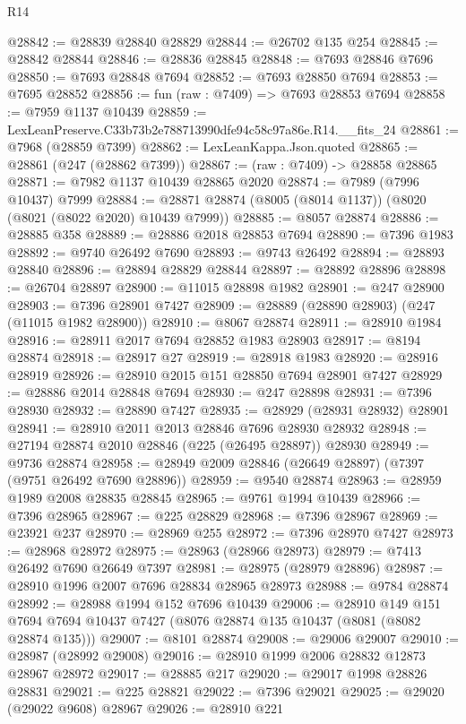 \begin{lexlean}{R14}
\begin{coremodule}
@28842 := @28839 @28840 @28829
@28844 := @26702 @135 @254
@28845 := @28842 @28844
@28846 := @28836 @28845
@28848 := @7693 @28846 @7696
@28850 := @7693 @28848 @7694
@28852 := @7693 @28850 @7694
@28853 := @7695 @28852
@28856 := fun (raw : @7409) => @7693 @28853 @7694
@28858 := @7959 @1137 @10439
@28859 := LexLeanPreserve.C33b73b2e788713990dfe94c58c97a86e.R14.__fits_24
@28861 := @7968 (@28859 @7399)
@28862 := LexLeanKappa.Json.quoted
@28865 := @28861 (@247 (@28862 @7399))
@28867 := (raw : @7409) -> @28858 @28865
@28871 := @7982 @1137 @10439 @28865 @2020
@28874 := @7989 (@7996 @10437) @7999
@28884 := @28871 @28874 (@8005 (@8014 @1137)) (@8020 (@8021 (@8022 @2020) @10439 @7999))
@28885 := @8057 @28874
@28886 := @28885 @358
@28889 := @28886 @2018 @28853 @7694
@28890 := @7396 @1983
@28892 := @9740 @26492 @7690
@28893 := @9743 @26492
@28894 := @28893 @28840
@28896 := @28894 @28829 @28844
@28897 := @28892 @28896
@28898 := @26704 @28897
@28900 := @11015 @28898 @1982
@28901 := @247 @28900
@28903 := @7396 @28901 @7427
@28909 := @28889 (@28890 @28903) (@247 (@11015 @1982 @28900))
@28910 := @8067 @28874
@28911 := @28910 @1984
@28916 := @28911 @2017 @7694 @28852 @1983 @28903
@28917 := @8194 @28874
@28918 := @28917 @27
@28919 := @28918 @1983
@28920 := @28916 @28919
@28926 := @28910 @2015 @151 @28850 @7694 @28901 @7427
@28929 := @28886 @2014 @28848 @7694
@28930 := @247 @28898
@28931 := @7396 @28930
@28932 := @28890 @7427
@28935 := @28929 (@28931 @28932) @28901
@28941 := @28910 @2011 @2013 @28846 @7696 @28930 @28932
@28948 := @27194 @28874 @2010 @28846 (@225 (@26495 @28897)) @28930
@28949 := @9736 @28874
@28958 := @28949 @2009 @28846 (@26649 @28897) (@7397 (@9751 @26492 @7690 @28896))
@28959 := @9540 @28874
@28963 := @28959 @1989 @2008 @28835 @28845
@28965 := @9761 @1994 @10439
@28966 := @7396 @28965
@28967 := @225 @28829
@28968 := @7396 @28967
@28969 := @23921 @237
@28970 := @28969 @255
@28972 := @7396 @28970 @7427
@28973 := @28968 @28972
@28975 := @28963 (@28966 @28973)
@28979 := @7413 @26492 @7690 @26649 @7397
@28981 := @28975 (@28979 @28896)
@28987 := @28910 @1996 @2007 @7696 @28834 @28965 @28973
@28988 := @9784 @28874
@28992 := @28988 @1994 @152 @7696 @10439
@29006 := @28910
    @149
    @151
    @7694
    @7694
    @10437
    @7427
    (@8076 @28874 @135 @10437 (@8081 (@8082 @28874 @135)))
@29007 := @8101 @28874
@29008 := @29006 @29007
@29010 := @28987 (@28992 @29008)
@29016 := @28910 @1999 @2006 @28832 @12873 @28967 @28972
@29017 := @28885 @217
@29020 := @29017 @1998 @28826 @28831
@29021 := @225 @28821
@29022 := @7396 @29021
@29025 := @29020 (@29022 @9608) @28967
@29026 := @28910 @221

\end{coremodule}
\end{lexlean}
